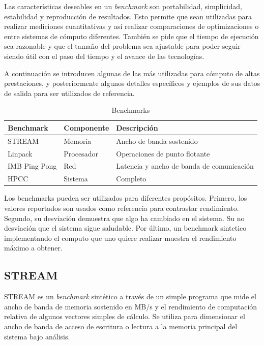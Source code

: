 \documentclass[a4paper]{report}
\begin{document}
\bigskip

Las caracter\'isticas deseables en un {\it benchmark} son portabilidad, simplicidad, estabilidad y
reproducci\'on de resultados. Esto permite que sean utilizadas para realizar
mediciones cuantitativas y as\'i realizar comparaciones de optimizaciones o
entre sistemas de c\'omputo diferentes. Tambi\'en se pide que el tiempo de
ejecuci\'on sea razonable y que el tama\~no del problema sea ajustable para
poder seguir siendo \'util con el paso del tiempo y el avance de las
tecnolog\'ias.

\bigskip

A continuaci\'on se introducen algunas de las m\'as utilizadas para c\'omputo
de altas prestaciones, y posteriormente algunos detalles espec\'ificos y ejemplos
de sus datos de salida para ser utilizados de referencia.

\begin{table}[H]
    \caption{Benchmarks}
    \centering
    \begin{tabular}{|l|l|l|}\hline
      {\bf Benchmark} & {\bf Componente} & {\bf Descripci\'on} \\ \hline
      STREAM & Memoria & Ancho de banda sostenido \\ \hline
      Linpack & Procesador & Operaciones de punto flotante \\ \hline
      IMB Ping Pong & Red & Latencia y ancho de banda de comunicaci\'on \\ \hline
      HPCC & Sistema & Completo \\ \hline
        \end{tabular}
  \label{benchmark-list}
\end{table}

\bigskip

Los benchmarks pueden ser utilizados para diferentes prop\'ositos. Primero, los valores reportados son usados como referencia
para contrastar rendimiento. Segundo, su desviaci\'on demuestra que algo ha cambiado en el sistema. Su no desviaci\'on que el sistema
sigue saludable. Por \'ultimo, un benchmark sintetico implementando el computo que uno quiere realizar muestra el
rendimiento m\'aximo a obtener.

\subsection{STREAM}

STREAM \cite{stream} es un {\it benchmark} sint\'etico a trav\'es de un simple
programa que mide el ancho de banda de memoria sostenido en MB/s y el
rendimiento de computaci\'on relativa de algunos vectores simples de c\'alculo.
Se utiliza para dimensionar el ancho de banda de acceso de escritura o lectura
a la memoria principal del sistema bajo an\'alisis.
\end{document}
